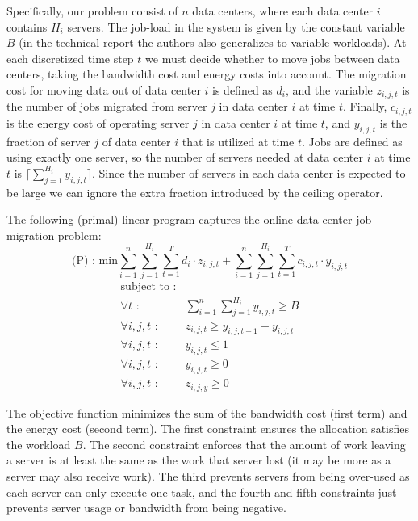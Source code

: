 Specifically, our problem consist of $n$ data centers, where each data center $i$ contains $H_i$ servers.
The job-load in the system is given by the constant variable $B$ (in the technical report the authors also generalizes to variable workloads).
At each discretized time step $t$ we must decide whether to move jobs between data centers, taking the bandwidth cost and energy costs into account.
The migration cost for moving data out of data center $i$ is defined as $d_i$, and the variable $z_{i,j,t}$ is the number of jobs migrated from server $j$ in data center $i$ at time $t$.
Finally, $c_{i,j,t}$ is the energy cost of operating server $j$ in data center $i$ at time $t$, and $y_{i,j,t}$ is the fraction of server $j$ of data center $i$ that is utilized at time $t$.
Jobs are defined as using exactly one server, so the number of servers needed at data center $i$ at time $t$ is $\lceil \sum^{H_i}_{j=1}y_{i,j,t} \rceil$.
Since the number of servers in each data center is expected to be large we can ignore the extra fraction introduced by the ceiling operator.

The following (primal) linear program captures the online data center job-migration problem:
\[
\textrm{(P) : min}  \sum^n_{i=1}\sum^{H_i}_{j=1}\sum^{T}_{t=1}d_{i} \cdot z_{i,j,t} + \sum^{n}_{i=1}\sum^{H_{i}}_{j=1}\sum^{T}_{t=1} c_{i,j,t} \cdot y_{i,j,t}
\]
\[
	\begin{array}{rc}
	\textrm{subject to :} & \\
		\forall t \textrm{ :} & \sum^n_{i=1}\sum^{H_i}_{j=1}y_{i,j,t} \geq B \\
		\forall i,j,t \textrm{ :}	    & z_{i,j,t} \geq y_{i,j,t-1} - y_{i,j,t} \\
		\forall i,j,t \textrm{ :}	    & y_{i,j,t} \leq 1 \\
		\forall i,j,t \textrm{ :}	    & y_{i,j,t} \geq 0 \\
		\forall i,j,t \textrm{ :}	    & z_{i,j,y} \geq 0
	\end{array}
\]

The objective function minimizes the sum of the bandwidth cost (first term) and the energy cost (second term).
The first constraint ensures the allocation satisfies the workload $B$.
The second constraint enforces that the amount of work leaving a server is at least the same as the work that server lost (it may be more as a server may also receive work).
The third prevents servers from being over-used as each server can only execute one task, and the fourth and fifth constraints just prevents server usage or bandwidth from being negative.


